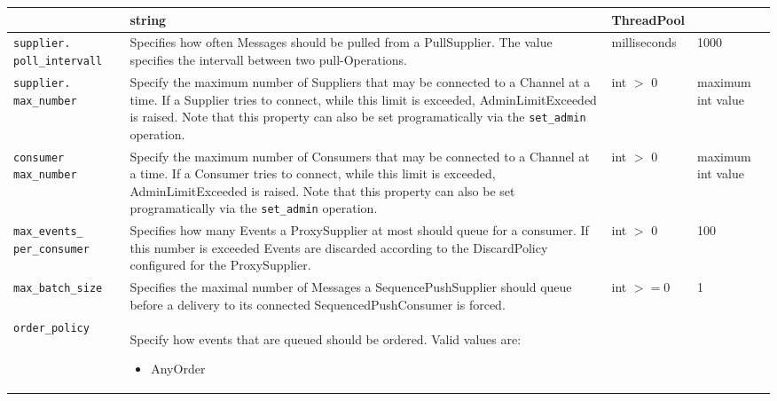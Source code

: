 \begin{small}
\begin{longtable}{|p{5cm}|p{7.5cm}|p{1.5cm}|p{1.5cm}|}
\begin{description}
    \end{description} & 
    string & Thread\-Pool \\ \hline

    \verb"supplier."
    \verb"poll_intervall" &

    Specifies how often Messages should be pulled from a PullSupplier. The
    value specifies the intervall between two pull-Operations. &

    milli\-seconds & 1000 \\ \hline

    \verb"supplier."
    \verb"max_number" &

    Specify the maximum number of Suppliers that may be connected to a
    Channel at a time. If a Supplier tries to connect, while this
    limit is exceeded, AdminLimitExceeded is raised. Note that this
    property can also be set programatically via the \texttt{set\_admin}
    operation. & int $>$ 0 & maximum int value \\ \hline

    \verb"consumer"
    \verb"max_number" &

    Specify the maximum number of Consumers that may be connected to a
    Channel at a time. If a Consumer tries to connect, while this
    limit is exceeded, AdminLimitExceeded is raised. Note that this
    property can also be set programatically via the
    \texttt{set\_admin} operation. &

    int $>$ 0 & maximum int value \\ \hline

    \verb"max_events_"
    \verb"per_consumer" &

    Specifies how many Events a ProxySupplier at most should queue for a
    consumer. If this number is exceeded Events are discarded according to
    the DiscardPolicy configured for the ProxySupplier. &

    int $>$ 0 & 100 \\ \hline

    \verb"max_batch_size" &

    Specifies the maximal number of Messages a SequencePushSupplier should
    queue before a delivery to its connected SequencedPushConsumer is
    forced. &

    int $>=0$ & 1 \\ \hline

    \verb"order_policy" &

    Specify how events that are queued should be ordered. Valid values
    are: 
    \begin{itemize}
    \item AnyOrder


\end{itemize}
\end{longtable}
\end{small}
